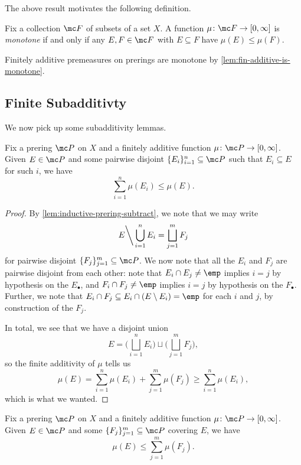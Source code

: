 \documentclass[../notes.tex]{subfiles}
\begin{document}
The above result motivates the following definition.
\begin{definition}[Monotone]
	Fix a collection $\mc F$ of subsets of a set $X$. A function $\mu\colon\mc F\to[0,\infty]$ is \textit{monotone} if and only if any $E,F\in\mc F$ with $E\subseteq F$ have $\mu(E)\le\mu(F)$.
\end{definition}
\begin{example}
	Finitely additive premeasures on prerings are monotone by \autoref{lem:fin-additive-is-monotone}.
\end{example}

\subsection{Finite Subadditivty}
We now pick up some subadditivity lemmas.
\begin{lemma} \label{lem:almost-subadditive}
	Fix a prering $\mc P$ on $X$ and a finitely additive function $\mu\colon\mc P\to[0,\infty]$. Given $E\in\mc P$ and some pairwise disjoint $\{E_i\}_{i=1}^n\subseteq\mc P$ such that $E_i\subseteq E$ for such $i$, we have
	\[\sum_{i=1}^n\mu(E_i)\le\mu(E).\]
\end{lemma}
\begin{proof}
	By \autoref{lem:inductive-prering-subtract}, we note that we may write
	\[E{\mathbin\bigg\backslash}\bigcup_{i=1}^nE_i=\bigsqcup_{j=1}^mF_j\]
	for pairwise disjoint $\{F_j\}_{j=1}^m\subseteq\mc P$. We now note that all the $E_i$ and $F_j$ are pairwise disjoint from each other: note that $E_i\cap E_j\ne\emp$ implies $i=j$ by hypothesis on the $E_\bullet$, and $F_i\cap F_j\ne\emp$ implies $i=j$ by hypothesis on the $F_\bullet$. Further, we note that $E_i\cap F_j\subseteq E_i\cap(E\setminus E_i)=\emp$ for each $i$ and $j$, by construction of the $F_j$.

	In total, we see that we have a disjoint union
	\[E=\Bigg(\bigsqcup_{i=1}^nE_i\Bigg)\sqcup\Bigg(\bigsqcup_{j=1}^mF_j\Bigg),\]
	so the finite additivity of $\mu$ tells us
	\[\mu(E)=\sum_{i=1}^n\mu(E_i)+\sum_{j=1}^m\mu(F_j)\ge\sum_{i=1}^n\mu(E_i),\]
	which is what we wanted.
\end{proof}
\begin{lemma} \label{lem:finitely-additive-is-subaddtive}
	Fix a prering $\mc P$ on $X$ and a finitely additive function $\mu\colon\mc P\to[0,\infty]$. Given $E\in\mc P$ and some $\{F_j\}_{j=1}^m\subseteq\mc P$ covering $E$, we have
	\[\mu(E)\le\sum_{j=1}^m\mu(F_j).\]
\end{lemma}
\end{document}
